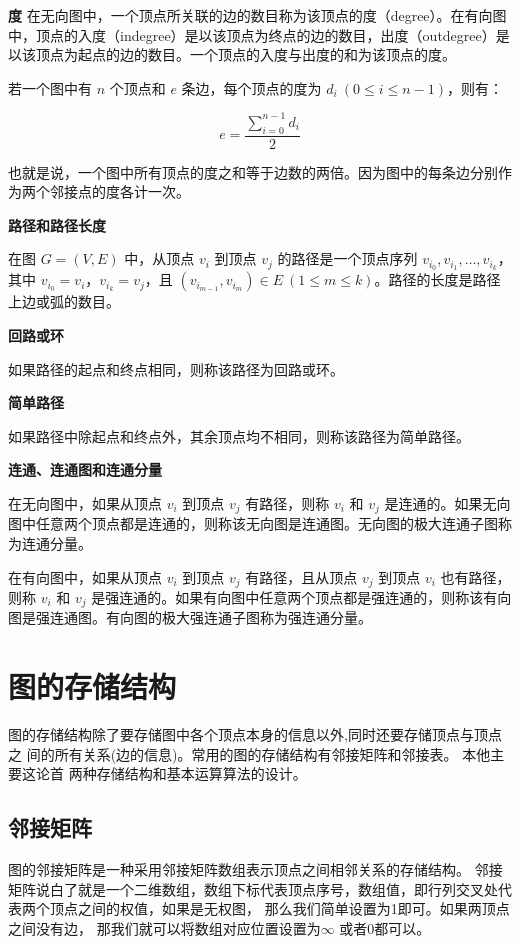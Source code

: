 \documentclass[lang=cn,newtx,10pt,scheme=chinese]{../elegantbook}
\begin{document}
\textbf{度}
在无向图中，一个顶点所关联的边的数目称为该顶点的度（degree）。在有向图中，顶点的入度（indegree）是以该顶点为终点的边的数目，出度（outdegree）是以该顶点为起点的边的数目。一个顶点的入度与出度的和为该顶点的度。

若一个图中有 $n$ 个顶点和 $e$ 条边，每个顶点的度为 $d_i \ (0 \leq i \leq n-1)$，则有：

\[
e = \frac{\sum_{i=0}^{n-1} d_i}{2}
\]

也就是说，一个图中所有顶点的度之和等于边数的两倍。因为图中的每条边分别作为两个邻接点的度各计一次。

\textbf{路径和路径长度}

在图 $G = (V, E)$ 中，从顶点 $v_i$ 到顶点 $v_j$ 的路径是一个顶点序列 $v_{i_0}, v_{i_1}, \dots, v_{i_k}$，其中 $v_{i_0} = v_i$，$v_{i_k} = v_j$，且 $(v_{i_{m-1}}, v_{i_m}) \in E \ (1 \leq m \leq k)$。路径的长度是路径上边或弧的数目。

\textbf{回路或环}

如果路径的起点和终点相同，则称该路径为回路或环。

\textbf{简单路径}

如果路径中除起点和终点外，其余顶点均不相同，则称该路径为简单路径。

\textbf{连通、连通图和连通分量}

在无向图中，如果从顶点 $v_i$ 到顶点 $v_j$ 有路径，则称 $v_i$ 和 $v_j$ 是连通的。如果无向图中任意两个顶点都是连通的，则称该无向图是连通图。无向图的极大连通子图称为连通分量。

在有向图中，如果从顶点 $v_i$ 到顶点 $v_j$ 有路径，且从顶点 $v_j$ 到顶点 $v_i$ 也有路径，则称 $v_i$ 和 $v_j$ 是强连通的。如果有向图中任意两个顶点都是强连通的，则称该有向图是强连通图。有向图的极大强连通子图称为强连通分量。




\section{图的存储结构}
图的存储结构除了要存储图中各个顶点本身的信息以外,同时还要存储顶点与顶点之
间的所有关系(边的信息)。常用的图的存储结构有邻接矩阵和邻接表。 本他主要这论首
两种存储结构和基本运算算法的设计。

\subsection{邻接矩阵}
图的邻接矩阵是一种采用邻接矩阵数组表示顶点之间相邻关系的存储结构。
邻接矩阵说白了就是一个二维数组，数组下标代表顶点序号，数组值，即行列交叉处代表两个顶点之间的权值，如果是无权图，
那么我们简单设置为1即可。如果两顶点之间没有边，
那我们就可以将数组对应位置设置为$\infty$ 或者0都可以。
\end{document}
